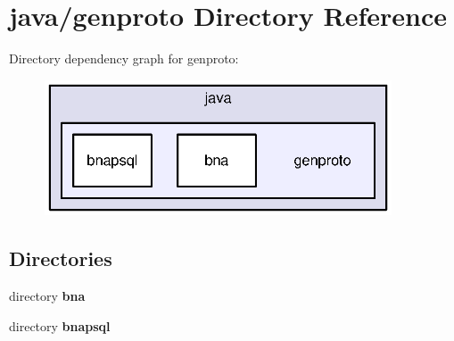 \section{java/genproto Directory Reference}
\label{dir_0e43b3eaa74cb4b3a4cbe492a3c2d8cb}
Directory dependency graph for genproto\+:
\nopagebreak
\begin{figure}[H]
\begin{center}
\leavevmode
\includegraphics[width=292pt]{dir_0e43b3eaa74cb4b3a4cbe492a3c2d8cb_dep}
\end{center}
\end{figure}
\subsection*{Directories}
\begin{DoxyCompactItemize}
\item 
directory {\bf bna}
\item 
directory {\bf bnapsql}
\end{DoxyCompactItemize}
